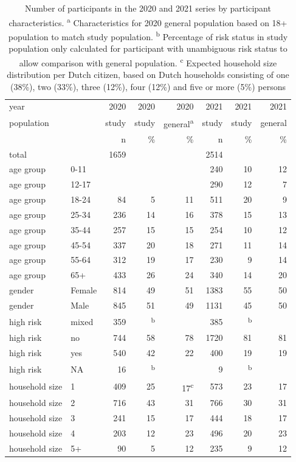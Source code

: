 \documentclass[fleqn,10pt]{wlscirep}
\begin{document}
\begin{table}[ht]
\centering
\begin{tabular}{llrrrrrr}
  \hline
 year  &  & 2020  & 2020  & 2020  & 2021 & 2021 & 2021 \\ 
population & & study & study & general\textsuperscript{a} & study & study & general \\
 &  & n & \% & \% & n & \% & \% \\ 
 \hline
 total   &  & 1659 &  &  & 2514 &  &  \\
 \hline
  age group & 0-11 &  &  &  & 240 & 10 & 12 \\ 
  age group & 12-17 &  &  &  & 290 & 12 & 7 \\ 
  age group & 18-24 & 84 & 5 & 11 & 511 & 20 & 9 \\ 
  age group & 25-34 & 236 & 14 & 16 & 378 & 15 & 13 \\ 
  age group & 35-44 & 257 & 15 & 15 & 254 & 10 & 12 \\ 
  age group & 45-54 & 337 & 20 & 18 & 271 & 11 & 14 \\ 
  age group & 55-64 & 312 & 19 & 17 & 230 & 9 & 14 \\ 
  age group & 65+ & 433 & 26 & 24 & 340 & 14 & 20 \\ 
 \hline
  gender & Female & 814 & 49 & 51 & 1383 & 55 & 50 \\ 
  gender & Male & 845 & 51 & 49 & 1131 & 45 & 50 \\ 
 \hline
  high risk & mixed & 359 & \textsuperscript{b}  &  & 385 & \textsuperscript{b} &  \\ 
  high risk & no & 744 & 58 & 78 & 1720 & 81 & 81 \\ 
  high risk & yes & 540 & 42 & 22 & 400 & 19 & 19 \\ 
  high risk & NA & 16 & \textsuperscript{b} &  & 9 & \textsuperscript{b} &  \\ 
 \hline
  household size & 1 & 409 & 25 & 17\textsuperscript{c} & 573 & 23 & 17 \\ 
  household size & 2 & 716 & 43 & 31 & 766 & 30 & 31 \\ 
  household size & 3 & 241 & 15 & 17 & 444 & 18 & 17 \\ 
  household size & 4 & 203 & 12 & 23 & 496 & 20 & 23 \\ 
  household size & 5+ & 90 & 5 & 12 & 235 & 9 & 12 \\ 
   \hline
\end{tabular}
\caption{\label{tab:part_old}Number of participants in the 2020 and 2021 series by participant characteristics.
 \protect\linebreak \textsuperscript{a} Characteristics for 2020 general population based on 18+ population to match study population.
 \protect\linebreak \textsuperscript{b} Percentage of risk status in study population only calculated for participant with unambiguous risk status to allow comparison with general population.
\protect\linebreak \textsuperscript{c} Expected household size distribution per Dutch citizen, based on Dutch households consisting of one (38\%), two (33\%), three (12\%), four (12\%) and five or more (5\%) persons \cite{Backer_2021}}
\end{table}
\end{document}
